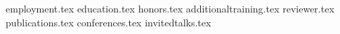 \documentclass[11pt, a4paper]{awesome-cv}
\newcommand*{\sectiondir}{sections/}
\begin{document}
\makecvheader

{employment.tex}
{education.tex}
{honors.tex}
{additionaltraining.tex}
\newpage
{reviewer.tex}
{publications.tex}
{conferences.tex}
{invitedtalks.tex}
\end{document}
